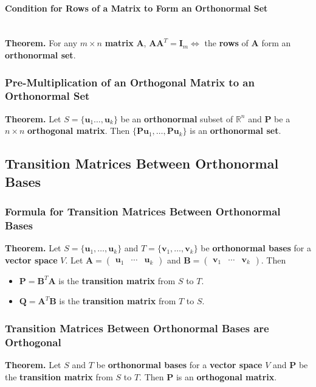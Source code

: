 \documentclass[../ma2001_notes.tex]{subfiles}
\begin{document}
\paragraph{Condition for Rows of a Matrix to Form an Orthonormal Set}\,\\
\textbf{Theorem.} For any \(m\times n\) \textbf{matrix} \(\bm{A}\), \(\bm{AA}^T=\bm{I}_m\Leftrightarrow\) the \textbf{rows} of \(\bm{A}\) form an \textbf{orthonormal set}.

\subsubsection{Pre-Multiplication of an Orthogonal Matrix to an Orthonormal Set}
\textbf{Theorem.} Let \(S=\{\bm{u}_1\ldots,\bm{u}_k\}\) be an \textbf{orthonormal} subset of \(\mathbb{R}^n\) and \(\bm{P}\) be a \(n\times n\) \textbf{orthogonal matrix}. Then \(\{\bm{Pu}_1,\ldots,\bm{Pu}_k\}\) is an \textbf{orthonormal set}.

\subsection{Transition Matrices Between Orthonormal Bases}
\subsubsection{Formula for Transition Matrices Between Orthonormal Bases}
\textbf{Theorem.} Let \(S=\{\bm{u}_1,\ldots,\bm{u}_k\}\) and \(T=\{\bm{v}_1,\ldots,\bm{v}_k\}\) be \textbf{orthonormal bases} for a \textbf{vector space} \(V\). Let \(\bm{A}=\begin{pmatrix}
	\bm{u}_1 & \cdots & \bm{u}_k
\end{pmatrix}\) and \(\bm{B}=\begin{pmatrix}
	\bm{v}_1 & \cdots & \bm{v}_k
\end{pmatrix}\). Then
\begin{itemize}
	\item\(\bm{P}=\bm{B}^T\bm{A}\) is the \textbf{transition matrix} from \(S\) to \(T\).
	\item\(\bm{Q}=\bm{A}^T\bm{B}\) is the \textbf{transition matrix} from \(T\) to \(S\).
\end{itemize}

\subsubsection{Transition Matrices Between Orthonormal Bases are Orthogonal}
\textbf{Theorem.} Let \(S\) and \(T\) be \textbf{orthonormal bases} for a \textbf{vector space} \(V\) and \(\bm{P}\) be the \textbf{transition matrix} from \(S\) to \(T\). Then \(\bm{P}\) is an \textbf{orthogonal matrix}.
\end{document}
